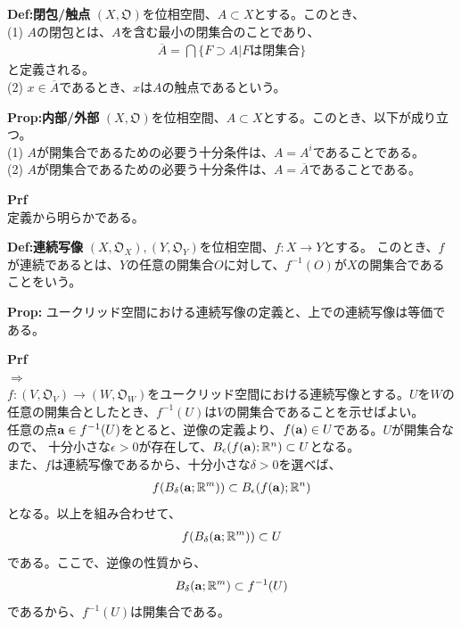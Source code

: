 \documentclass[a4paper,11pt]{jsarticle}
\numberwithin{equation}{section}
\begin{document}
\begin{itembox}[l]{\textbf{Def:閉包/触点}}
  $(X,\mathfrak{O})$を位相空間、$A \subset X$とする。このとき、\\
  (1) $A$の閉包とは、$A$を含む最小の閉集合のことであり、
  \begin{align}
    \overline{A} = \bigcap \{F \supset A | F \text{は閉集合}\}
  \end{align}
  と定義される。\\
  (2) $x \in \overline{A}$であるとき、$x$は$A$の触点であるという。

\end{itembox}

\begin{itembox}[l]{\textbf{Prop:内部/外部}}
  $(X,\mathfrak{O})$を位相空間、$A \subset X$とする。このとき、以下が成り立つ。\\
  (1) $A$が開集合であるための必要う十分条件は、$A = A^{i}$であることである。\\
  (2) $A$が閉集合であるための必要う十分条件は、$A = \overline{A}$であることである。
\end{itembox}
\textbf{Prf}\\
定義から明らかである。\hfill\qedsymbol\\

\begin{itembox}[l]{\textbf{Def:連続写像}}
  $(X,\mathfrak{O}_X),(Y,\mathfrak{O}_Y)$を位相空間、$f:X \to Y$とする。
  このとき、$f$が連続であるとは、$Y$の任意の開集合$O$に対して、$f^{-1}(O)$が$X$の開集合であることをいう。
\end{itembox}

\begin{itembox}[l]{\textbf{Prop:}}
  ユークリッド空間における連続写像の定義と、上での連続写像は等価である。
\end{itembox}
\textbf{Prf}\\
\textbf{$\Rightarrow$}\\
$f:(V,\mathfrak{O}_V) \to (W,\mathfrak{O}_W)$をユークリッド空間における連続写像とする。$U$を$W$の任意の開集合としたとき、$f^{-1}(U)$は$V$の開集合であることを示せばよい。\\
任意の点$\vb{a} \in f^{-1}(U)$をとると、逆像の定義より、$f(\vb{a}) \in U$である。$U$が開集合なので、
十分小さな$\epsilon > 0$が存在して、$B_{\epsilon}(f(\vb{a});\mathbb{R}^n) \subset U$となる。\\
また、$f$は連続写像であるから、十分小さな$\delta > 0$を選べば、
\begin{align}
  f(B_{\delta}(\vb{a};\mathbb{R}^m)) \subset B_{\epsilon}(f(\vb{a});\mathbb{R}^n)
\end{align}
となる。以上を組み合わせて、
\begin{align}
  f(B_{\delta}(\vb{a};\mathbb{R}^m)) \subset U
\end{align}
である。ここで、逆像の性質から、
\begin{align}
  B_{\delta}(\vb{a};\mathbb{R}^m) \subset f^{-1}(U)
\end{align}
であるから、$f^{-1}(U)$は開集合である。\\
\end{document}
